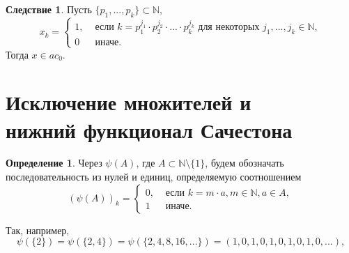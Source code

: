\documentclass[a4paper,openbib]{article}
\theoremstyle{definition}
\newtheorem{definition}[lemma]{Определение}
\newtheorem{corollary}{Следствие}[lemma]
\begin{document}
\begin{corollary}
	\label{cor:ac0_powers_finite_set_of_numbers}
	Пусть $\{p_1, ..., p_k\} \subset \mathbb{N}$,
	\begin{equation}
		x_k = \begin{cases}
			1, &\mbox{~если~} k = p_1^{j_1}\cdot p_2^{j_2}\cdot ... \cdot p_k^{j_k} \mbox{~для некоторых~} j_1,...,j_k\in\mathbb{N},
			\\
			0  &\mbox{~иначе}.
		\end{cases}
	\end{equation}
	Тогда $x\in ac_0$.
\end{corollary}




\section{Исключение множителей и \\  нижний функционал Сачестона}



\begin{definition}
	Через $\psi(A)$, где $A\subset\mathbb{N}\setminus\{1\}$,
	будем обозначать последовательность из нулей и единиц,
	определяемую соотношением
	\begin{equation}
		(\psi(A))_k = \begin{cases}
			0, & \mbox{~если~} k = m\cdot a, m \in \mathbb{N}, a\in A,
			\\
			1  & \mbox{~иначе.}
		\end{cases}
	\end{equation}
\end{definition}

Так, например,
\begin{equation}
	\psi(\{2\}) = \psi(\{2, 4\}) = \psi(\{2,4,8,16,...\}) = (1,0,1,0,1,0,1,0,1,0,...),
\end{equation}
\end{document}
